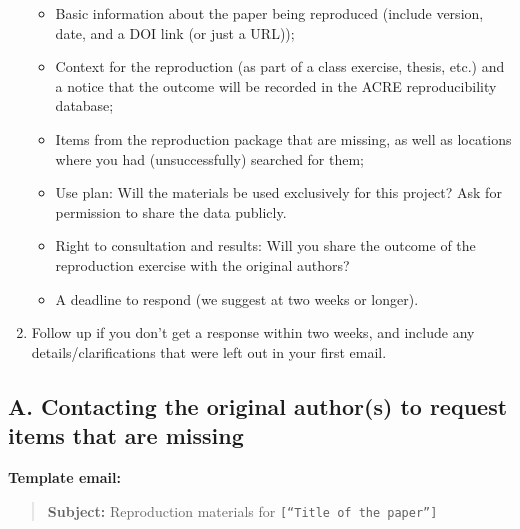 \documentclass[]{book}
\providecommand{\tightlist}{%
  \setlength{\itemsep}{0pt}\setlength{\parskip}{0pt}}
\begin{document}
\begin{enumerate}
  \begin{itemize}
  \tightlist
  \item
    Basic information about the paper being reproduced (include version, date, and a DOI link (or just a URL));\\
  \item
    Context for the reproduction (as part of a class exercise, thesis, etc.) and a notice that the outcome will be recorded in the ACRE reproducibility database;\\
  \item
    Items from the reproduction package that are missing, as well as locations where you had (unsuccessfully) searched for them;\\
  \item
    Use plan: Will the materials be used exclusively for this project? Ask for permission to share the data publicly.\\
  \item
    Right to consultation and results: Will you share the outcome of the reproduction exercise with the original authors?\\
  \item
    A deadline to respond (we suggest at two weeks or longer).
  \end{itemize}
\item
  Follow up if you don't get a response within two weeks, and include any details/clarifications that were left out in your first email.
\end{enumerate}

\hypertarget{a.-contacting-the-original-authors-to-request-items-that-are-missing}{%
\subsection{A. Contacting the original author(s) to request items that are missing}\label{a.-contacting-the-original-authors-to-request-items-that-are-missing}}

\textbf{Template email:}

\begin{quote}
\textbf{Subject:} Reproduction materials for \texttt{{[}“Title\ of\ the\ paper”{]}}
\end{quote}
\end{document}
